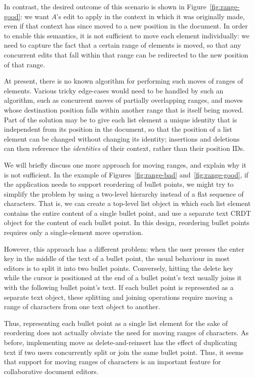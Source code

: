 \documentclass[sigplan,10pt]{acmart}
\begin{document}
In contrast, the desired outcome of this scenario is shown in Figure~\ref{fig:range-good}: we want $A$'s edit to apply in the context in which it was originally made, even if that context has since moved to a new position in the document.
In order to enable this semantics, it is not sufficient to move each element individually: we need to capture the fact that a certain range of elements is moved, so that any concurrent edits that fall within that range can be redirected to the new position of that range.

At present, there is no known algorithm for performing such moves of ranges of elements.
Various tricky edge-cases would need to be handled by such an algorithm, such as concurrent moves of partially overlapping ranges, and moves whose destination position falls within another range that is itself being moved.
Part of the solution may be to give each list element a unique identity that is independent from its position in the document, so that the position of a list element can be changed without changing its identity; insertions and deletions can then reference the \emph{identities} of their context, rather than their position IDs.

We will briefly discuss one more approach for moving ranges, and explain why it is not sufficient.
In the example of Figures~\ref{fig:range-bad} and~\ref{fig:range-good}, if the application needs to support reordering of bullet points, we might try to simplify the problem by using a two-level hierarchy instead of a flat sequence of characters.
That is, we can create a top-level list object in which each list element contains the entire content of a single bullet point, and use a separate text CRDT object for the content of each bullet point.
In this design, reordering bullet points requires only a single-element move operation.

However, this approach has a different problem: when the user presses the enter key in the middle of the text of a bullet point, the usual behaviour in most editors is to split it into two bullet points.
Conversely, hitting the delete key while the cursor is positioned at the end of a bullet point's text usually joins it with the following bullet point's text.
If each bullet point is represented as a separate text object, these splitting and joining operations require moving a range of characters from one text object to another.

Thus, representing each bullet point as a single list element for the sake of reordering does not actually obviate the need for moving ranges of characters.
As before, implementing move as delete-and-reinsert has the effect of duplicating text if two users concurrently split or join the same bullet point.
Thus, it seems that support for moving ranges of characters is an important feature for collaborative document editors.
\end{document}
